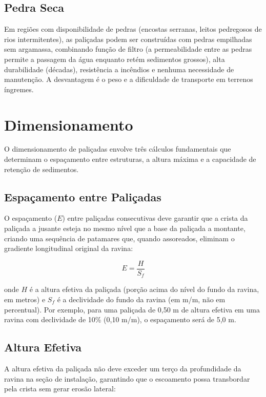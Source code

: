 \documentclass[
  portuguese,
  11pt,
  a4paper,
  open=any]{scrbook}
\begin{document}
\subsection{Pedra Seca}\label{pedra-seca}

Em regiões com disponibilidade de pedras (encostas serranas, leitos
pedregosos de rios intermitentes), as paliçadas podem ser construídas
com pedras empilhadas sem argamassa, combinando função de filtro (a
permeabilidade entre as pedras permite a passagem da água enquanto retém
sedimentos grossos), alta durabilidade (décadas), resistência a
incêndios e nenhuma necessidade de manutenção. A desvantagem é o peso e
a dificuldade de transporte em terrenos íngremes.

\section{Dimensionamento}\label{dimensionamento}

O dimensionamento de paliçadas envolve três cálculos fundamentais que
determinam o espaçamento entre estruturas, a altura máxima e a
capacidade de retenção de sedimentos.

\subsection{Espaçamento entre
Paliçadas}\label{espauxe7amento-entre-paliuxe7adas}

O espaçamento (\(E\)) entre paliçadas consecutivas deve garantir que a
crista da paliçada a jusante esteja no mesmo nível que a base da
paliçada a montante, criando uma sequência de patamares que, quando
assoreados, eliminam o gradiente longitudinal original da ravina:

\[
E = \frac{H}{S_f}
\]

onde \(H\) é a altura efetiva da paliçada (porção acima do nível do
fundo da ravina, em metros) e \(S_f\) é a declividade do fundo da ravina
(em m/m, não em percentual). Por exemplo, para uma paliçada de 0,50 m de
altura efetiva em uma ravina com declividade de 10\% (0,10 m/m), o
espaçamento será de 5,0 m.

\subsection{Altura Efetiva}\label{altura-efetiva}

A altura efetiva da paliçada não deve exceder um terço da profundidade
da ravina na seção de instalação, garantindo que o escoamento possa
transbordar pela crista sem gerar erosão lateral:
\end{document}
